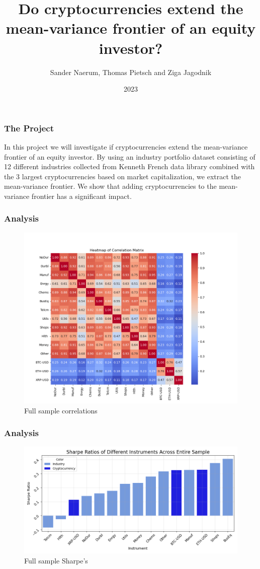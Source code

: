 \documentclass{beamer}
\title{Do cryptocurrencies extend the mean-variance frontier of an equity investor?}
\author{Sander Naerum, Thomas Pietsch and Ziga Jagodnik}
\institute{UZH}
\date{2023}
\begin{document}
\frame{\titlepage}

\begin{frame}
\frametitle{The Project}
In this project we will investigate if cryptocurrencies extend the mean-variance frontier of an equity investor. 
By using an industry portfolio dataset consisting of 12 different industries collected from Kenneth French data 
library combined with the 3 largest cryptocurrencies based on market capitalization, we extract the mean-variance 
frontier. We show that adding cryptocurrencies to the mean-variance frontier has a significant impact.
\end{frame}

\begin{frame}
\frametitle{Analysis}
\begin{figure}
    \centering
    \includegraphics[width=0.8\linewidth]{Figures/heatmap_correlation.png}
    \caption{Full sample correlations}
    \label{fig:corr}
\end{figure}
\end{frame}

\begin{frame}
\frametitle{Analysis}
\begin{figure}
    \centering
    \includegraphics[width=0.8\linewidth]{Figures/SR_Entire_Sample.png}
    \caption{Full sample Sharpe's}
    \label{fig:sharpe}
\end{figure}
\end{frame}
\end{document}
